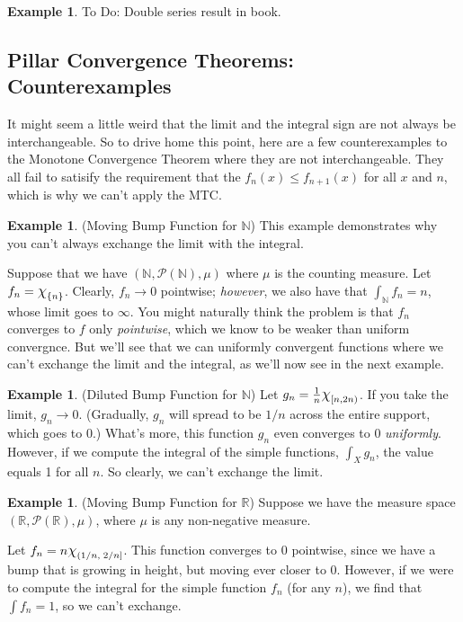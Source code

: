 \documentclass[12pt]{article}
\theoremstyle{plain}
\theoremstyle{definition}
\newtheorem{ex}[thm]{Example}
\theoremstyle{remark}
\newcommand*{\Chi}{\mbox{\large$\chi$}} %
\begin{document}
\begin{ex}
To Do: Double series result in book.
\end{ex}

\subsection{Pillar Convergence Theorems: Counterexamples}

It might seem a little weird that the limit and the integral sign are not always be interchangeable. So to drive home this point, here are a few counterexamples to the Monotone Convergence Theorem where they are not interchangeable. They all fail to satisify the requirement that the $f_n(x)\leq f_{n+1}(x)$ for all $x$ and $n$, which is why we can't apply the MTC.

\begin{ex}
(Moving Bump Function for $\mathbb{N}$) This example demonstrates why you can't always exchange the limit with the integral. 

Suppose that we have $(\mathbb{N},\mathscr{P}(\mathbb{N}),\mu)$ where $\mu$ is the counting measure.  Let $f_n = \Chi_{\{n\}}$.  Clearly, $f_n\rightarrow 0$ pointwise; \emph{however}, we also have that $\int_\mathbb{N} f_n = n$, whose limit goes to $\infty$. You might naturally think the problem is that $f_n$ converges to $f$ only \emph{pointwise}, which we know to be weaker than uniform convergnce. But we'll see that we can uniformly convergent functions where we can't exchange the limit and the integral, as we'll now see in the next example.
\end{ex}

\begin{ex} (Diluted Bump Function for $\mathbb{N}$)
Let $g_n = \frac{1}{n}\Chi_{[n,2n)}$. If you take the limit, $g_n\rightarrow 0$. (Gradually, $g_n$ will spread to be $1/n$ across the entire support, which goes to 0.) What's more, this function $g_n$ even converges to 0 \emph{uniformly}. However, if we compute the integral of the simple functions, $\int_X g_n$, the value equals 1 for all $n$. So clearly, we can't exchange the limit. 
\end{ex}

\begin{ex}
(Moving Bump Function for $\mathbb{R}$) Suppose we have the measure space $(\mathbb{R},\mathscr{P}(\mathbb{R}),\mu)$, where $\mu$ is any non-negative measure. 

Let $f_n = n\Chi_{(1/n,\;2/n]}$. This function converges to 0 pointwise, since we have a bump that is growing in height, but moving ever closer to 0. However, if we were to compute the integral for the simple function $f_n$ (for any $n$), we find that $\int f_n = 1$, so we can't exchange.
\end{ex} 
\end{document}
